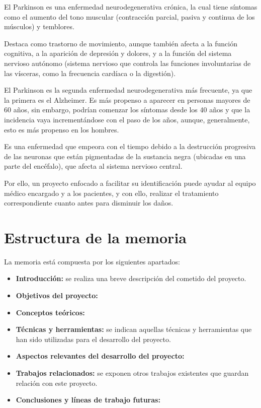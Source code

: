 El Parkinson\cite{parkinson} es una enfermedad neurodegenerativa crónica, la cual tiene síntomas como el aumento del tono muscular\cite{tonomuscular} (contracción parcial, pasiva y continua de los músculos) y temblores.

Destaca como trastorno de movimiento, aunque también afecta a la función cognitiva, a la aparición de depresión y dolores, y a la función del sistema nervioso autónomo\cite{sistnervautonomo} (sistema nervioso que controla las funciones involuntarias de las vísceras, como la frecuencia cardíaca o la digestión).

El Parkinson es la segunda enfermedad neurodegenerativa más frecuente, ya que la primera es el Alzheimer. Es más propenso a aparecer en personas mayores de 60 años, sin embargo, podrían comenzar los síntomas desde los 40 años y que la incidencia vaya incrementándose con el paso de los años, aunque, generalmente, esto es más propenso en los hombres.

Es una enfermedad que empeora con el tiempo debido a la destrucción progresiva de las neuronas que están pigmentadas de la sustancia negra\cite{sustancianegra} (ubicadas en una parte del encéfalo), que afecta al sistema nervioso central.

Por ello, un proyecto enfocado a facilitar su identificación puede ayudar al equipo médico encargado y a los pacientes, y con ello, realizar el tratamiento correspondiente cuanto antes para disminuir los daños.

\section{Estructura de la memoria}
La memoria está compuesta por los siguientes apartados:
\begin{itemize}
	\item \textbf{Introducción:} se realiza una breve descripción del cometido del proyecto.
	\item \textbf{Objetivos del proyecto:}
	\item \textbf{Conceptos teóricos:}
	\item \textbf{Técnicas y herramientas:} se indican aquellas técnicas y herramientas que han sido utilizadas para el desarrollo del proyecto.
	\item \textbf{Aspectos relevantes del desarrollo del proyecto:}
	\item \textbf{Trabajos relacionados:} se exponen otros trabajos existentes que guardan relación con este proyecto.
	\item \textbf{Conclusiones y líneas de trabajo futuras:}
\end{itemize}

